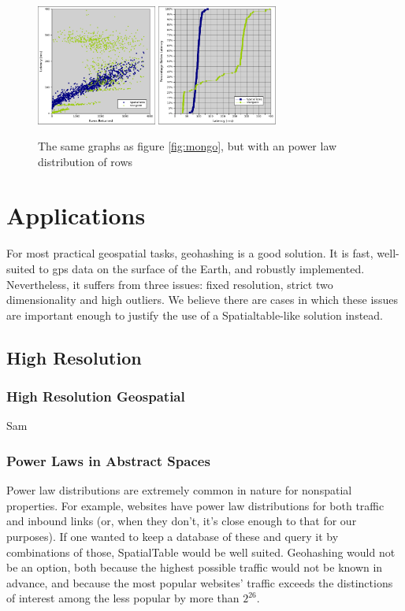 \documentclass[11pt]{article}
\begin{document}
\begin{figure}[h]
\includegraphics[width=1.55in]{st_mongo_exp}
\includegraphics[width=1.55in]{st_mongo_exp_cumu}
\caption{The same graphs as figure \ref{fig:mongo}, but with an power law distribution of rows}
\label{fig:mongoexp}
\end{figure}

\section{Applications}

For most practical geospatial tasks, geohashing is a good solution.  It is fast, well-suited to gps data on the surface of the Earth, and robustly implemented.  Nevertheless, it suffers from three issues: fixed resolution, strict two dimensionality and high outliers.  We believe there are cases in which these issues are important enough to justify the use of a Spatialtable-like solution instead.

\subsection{High Resolution}

\subsubsection{High Resolution Geospatial}
Sam

\subsubsection{Power Laws in Abstract Spaces}

Power law distributions are extremely common in nature for nonspatial properties.  For example, websites have power law distributions for both traffic and inbound links (or, when they don't, it's close enough to that for our purposes)\cite{powlaw}.  If one wanted to keep a database of these and query it by combinations of those, SpatialTable would be well suited.  Geohashing would not be an option, both because the highest possible traffic would not be known in advance, and because the most popular websites' traffic exceeds the distinctions of interest among the less popular by more than $2^{26}$.
\end{document}
